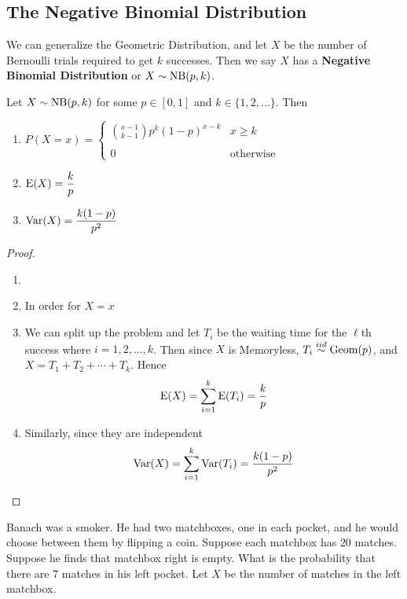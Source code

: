 \subsection{The Negative Binomial Distribution}
\newcommand{\nbin}{\textup{NB}}
We can generalize the Geometric Distribution, and let $X$ be the number of Bernoulli trials required to get $k$ successes. Then we say $X$ has a \textbf{Negative Binomial Distribution} or $X\sim \nbin(p,k)$.
\begin{theorem}
    Let $X\sim \nbin(p,k)$ for some $p\in[0,1]$ and $k\in\{1,2,...\}$. Then
    \begin{enumerate}
        \item $P(X=x)=\begin{cases}
                \displaystyle\binom {x-1}{k-1} p^{k}(1-p)^{x-k} & x \ge k\\\\
                0 & \text{otherwise}
            \end{cases}$
        \item $\textup{E}(X)=\displaystyle\frac k p$
        \item $\textup{Var}(X)=\displaystyle\frac{k(1-p)}{p^2}$
    \end{enumerate}

    \begin{proof}
    \begin{enumerate}
        \item[]
        \item In order for $X=x$
        \item We can split up the problem and let $T_i$ be the waiting time for the $\ell$th success where $i=1,2,...,k$. Then since $X$ is Memoryless, $T_i\overset{iid}\sim \text{Geom}(p)$, and $X=T_1+T_2+\cdots + T_k$. Hence
        \[
            \textup{E}(X)=\sum_{i=1}^k \textup{E}(T_i)=\frac k p
        \]
        \item Similarly, since they are independent
        \[
            \textup{Var}(X)=\sum_{i=1}^k \textup{Var}(T_i)=\frac{k(1-p)}{p^2}
        \]
    \end{enumerate}
    \end{proof}
\end{theorem}

Banach was a smoker. He had two matchboxes, one in each pocket, and he would choose between them by flipping a coin. 
Suppose each matchbox has $20$ matches. Suppose he finds that matchbox right is empty. What is the probability that there are 7 matches in his left pocket. Let $X$ be the number of matches in the left matchbox. 

